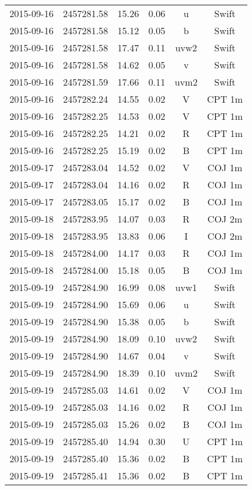 \begin{table}
\begin{tabular}{cccccc}
2015-09-16 & 2457281.58 & 15.26 & 0.06 & u & Swift \\
2015-09-16 & 2457281.58 & 15.12 & 0.05 & b & Swift \\
2015-09-16 & 2457281.58 & 17.47 & 0.11 & uvw2 & Swift \\
2015-09-16 & 2457281.58 & 14.62 & 0.05 & v & Swift \\
2015-09-16 & 2457281.59 & 17.66 & 0.11 & uvm2 & Swift \\
2015-09-16 & 2457282.24 & 14.55 & 0.02 & V & CPT 1m \\
2015-09-16 & 2457282.25 & 14.53 & 0.02 & V & CPT 1m \\
2015-09-16 & 2457282.25 & 14.21 & 0.02 & R & CPT 1m \\
2015-09-16 & 2457282.25 & 15.19 & 0.02 & B & CPT 1m \\
2015-09-17 & 2457283.04 & 14.52 & 0.02 & V & COJ 1m \\
2015-09-17 & 2457283.04 & 14.16 & 0.02 & R & COJ 1m \\
2015-09-17 & 2457283.05 & 15.17 & 0.02 & B & COJ 1m \\
2015-09-18 & 2457283.95 & 14.07 & 0.03 & R & COJ 2m \\
2015-09-18 & 2457283.95 & 13.83 & 0.06 & I & COJ 2m \\
2015-09-18 & 2457284.00 & 14.17 & 0.03 & R & COJ 1m \\
2015-09-18 & 2457284.00 & 15.18 & 0.05 & B & COJ 1m \\
2015-09-19 & 2457284.90 & 16.99 & 0.08 & uvw1 & Swift \\
2015-09-19 & 2457284.90 & 15.69 & 0.06 & u & Swift \\
2015-09-19 & 2457284.90 & 15.38 & 0.05 & b & Swift \\
2015-09-19 & 2457284.90 & 18.09 & 0.10 & uvw2 & Swift \\
2015-09-19 & 2457284.90 & 14.67 & 0.04 & v & Swift \\
2015-09-19 & 2457284.90 & 18.39 & 0.10 & uvm2 & Swift \\
2015-09-19 & 2457285.03 & 14.61 & 0.02 & V & COJ 1m \\
2015-09-19 & 2457285.03 & 14.16 & 0.02 & R & COJ 1m \\
2015-09-19 & 2457285.03 & 15.26 & 0.02 & B & COJ 1m \\
2015-09-19 & 2457285.40 & 14.94 & 0.30 & U & CPT 1m \\
2015-09-19 & 2457285.40 & 15.36 & 0.02 & B & CPT 1m \\
2015-09-19 & 2457285.41 & 15.36 & 0.02 & B & CPT 1m \\

\end{tabular}
\end{table}
